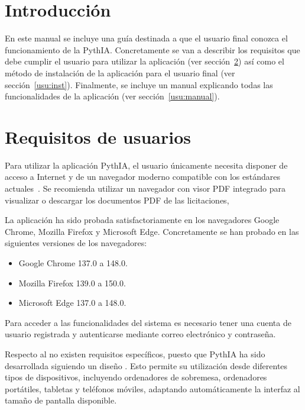 
\section{Introducción}

En este manual se incluye una guía destinada a que el usuario final conozca el funcionamiento de la  PythIA. Concretamente se van a describir los requisitos que debe cumplir el usuario para utilizar la aplicación (ver sección~\ref{usu:req}) así como el método de instalación de la aplicación para el usuario final (ver sección~\ref{usu:inst}). Finalmente, se incluye un manual explicando todas las funcionalidades de la aplicación (ver sección~\ref{usu:manual}).

\section{Requisitos de usuarios}
\label{usu:req}

Para utilizar la aplicación PythIA, el usuario únicamente necesita disponer de acceso a Internet y de un navegador  moderno compatible con los estándares actuales~\cite{usuario:webStandards}. Se recomienda utilizar un navegador con visor PDF integrado para visualizar o descargar los documentos PDF de las licitaciones, 

La aplicación ha sido probada satisfactoriamente en los navegadores Google Chrome, Mozilla Firefox y Microsoft Edge. Concretamente se han probado en las siguientes versiones de los navegadores:
\begin{itemize}
	\item Google Chrome 137.0 a  148.0.
	\item Mozilla Firefox 139.0 a 150.0.
	\item Microsoft Edge 137.0 a 148.0.
\end{itemize}

Para acceder a las funcionalidades del sistema es necesario tener una cuenta de usuario registrada y autenticarse mediante correo electrónico y contraseña.

Respecto al  no existen requisitos específicos, puesto que PythIA ha sido desarrollada siguiendo un diseño . Esto permite su utilización desde diferentes tipos de dispositivos, incluyendo ordenadores de sobremesa, ordenadores portátiles, tabletas y teléfonos móviles, adaptando automáticamente la interfaz al tamaño de pantalla disponible. 

